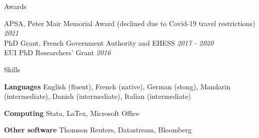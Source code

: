 \documentclass{resume} %
\begin{document}

\begin{rSection}{Awards}

APSA, Peter Mair Memorial Award (declined due to Covid-19 travel restrictions)	 \hfill  {\em 2021} \\
PhD Grant, French Government Authority and EHESS \hfill  {\em 2017 - 2020} \\
EUI PhD Researchers’ Grant \hfill {\em 2016} \\


\end{rSection}


\begin{rSection}{Skills}

{\bf Languages} English (fluent), French (native), German (stong), Mandarin (intermediate), Danish (intermediate), Italian (intermediate)

{\bf Computing} Stata, LaTex, Microsoft Office

{\bf Other software} Thomson Reuters, Datastream, Bloomberg 

\end{rSection}







\end{document}
